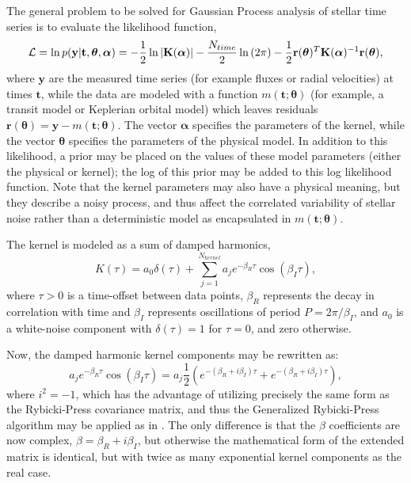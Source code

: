 \documentclass[manuscript, letterpaper]{aastex6}
\makeatletter
\let\origsection\section
\renewcommand\section{\@ifstar{\starsection}{\nostarsection}}
\newcommand\nostarsection[1]{\sectionprelude\origsection{#1}}
\newcommand\starsection[1]{\sectionprelude\origsection*{#1}}
\newcommand\sectionprelude{\vspace{1em}}
\newcommand{\bvec}[1]{{\ensuremath{\boldsymbol{#1}}}}
\makeatother
\begin{document}
\section{Generalized Press-Rybicki}

The general problem to be solved for Gaussian Process analysis of stellar time series is to evaluate
the likelihood function,
\begin{equation}
{\cal{L}} = \ln{p(\mathbf{y}\vert {\mathbf{t},\bvec{\theta}},\bvec{\alpha})} = -\frac{1}{2}\ln{\vert \mathbf{K}(\bvec{\alpha}) \vert}
- \frac{N_{time}}{2} \ln{(2\pi)}
    - \frac{1}{2} {\mathbf r} (\bvec{\theta} ) ^T \mathbf{K}(\bvec{\alpha})^{-1} \mathbf{r}(\bvec{\theta}),
\end{equation}
where $\mathbf{y}$ are the measured time series (for example fluxes or radial velocities) at times
$\mathbf{t}$, while the data are modeled with a function $m(\mathbf{t};\bvec{\theta})$ (for example,
a transit model or Keplerian orbital model) which leaves residuals $\mathbf{r}(\bvec{\theta}) =
\mathbf{y} - m(\mathbf{t};\bvec{\theta})$. %
The vector $\bvec{\alpha}$ specifies the parameters of the kernel, while the vector $\bvec{\theta}$
specifies the parameters of the physical model.  In addition to this likelihood, a prior may be placed on 
the values of these model parameters (either the physical or kernel); the log of this prior may be
added to this log likelihood function.  Note that the kernel
parameters may also have a physical meaning, but they describe a noisy process, and thus affect
the correlated variability of stellar noise rather than a deterministic model as encapsulated in
$m(\mathbf{t};\bvec{\theta})$.

The kernel is modeled as a sum of damped harmonics,
\begin{equation}
K(\tau) = a_0 \delta(\tau) + \sum_{j=1}^{N_{kernel}} a_j e^{-\beta_R \tau} \cos{(\beta_I \tau)},
\end{equation}
where $\tau > 0$ is a time-offset between data points, $\beta_R$ represents the decay 
in correlation with time and $\beta_I$ represents oscillations of period $P = 2\pi/\beta_I$, and
$a_0$ is a white-noise component with $\delta(\tau) = 1$ for $\tau=0$,
and zero otherwise.

Now, the damped harmonic kernel components may be rewritten as:
\begin{equation}
 a_j e^{-\beta_R \tau} \cos{(\beta_I \tau)} = a_j \frac{1}{2}\left( e^{-(\beta_R + i \beta_I) \tau} +  e^{-(\beta_R + i \beta_I) \tau}\right),
\end{equation}
where $i^2 = -1$, which has the advantage of utilizing precisely the same form as the Rybicki-Press covariance
matrix, and thus the Generalized Rybicki-Press algorithm may be applied as in \citet{Ambikasaran2015}.
The only difference is that the $\beta$ coefficients are now complex, $\beta = \beta_R + i \beta_I$,
but otherwise the mathematical form of the extended matrix is identical, but with twice as many
exponential kernel components as the real case.
\end{document}
